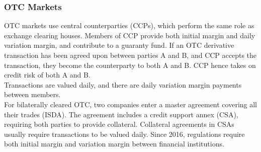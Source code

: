 \subsubsection{OTC Markets}

OTC markets use central counterparties (CCPs), which perform the same role as exchange clearing houses. Members of CCP provide both initial margin and daily variation margin, and contribute to a guaranty fund. If an OTC derivative transaction has been agreed upon between parties A and B, and CCP accepts the transaction, they become the counterparty to both A and B. CCP hence takes on credit risk of both A and B.\\
Transactions are valued daily, and there are daily variation margin payments between members.\\

For bilaterally cleared OTC, two companies enter a master agreement covering all their trades (ISDA). The agreement includes a credit support annex (CSA), requiring both parties to provide collateral. Collateral agreements in CSAs usually require transactions to be valued daily. Since 2016, regulations require both initial margin and variation margin between financial institutions.

